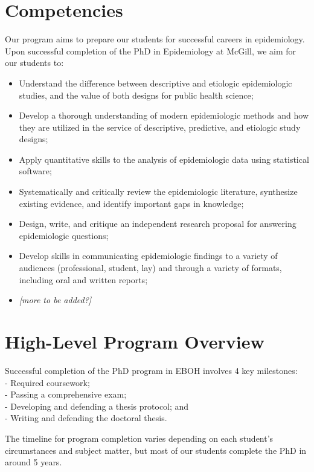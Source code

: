 \documentclass[
]{book}
\providecommand{\tightlist}{%
  \setlength{\itemsep}{0pt}\setlength{\parskip}{0pt}}
\begin{document}
\hypertarget{competencies}{%
\section{Competencies}\label{competencies}}

Our program aims to prepare our students for successful careers in epidemiology. Upon successful completion of the PhD in Epidemiology at McGill, we aim for our students to:

\begin{itemize}
\tightlist
\item
  Understand the difference between descriptive and etiologic epidemiologic studies, and the value of both designs for public health science;
\item
  Develop a thorough understanding of modern epidemiologic methods and how they are utilized in the service of descriptive, predictive, and etiologic study designs;
\item
  Apply quantitative skills to the analysis of epidemiologic data using statistical software;
\item
  Systematically and critically review the epidemiologic literature, synthesize existing evidence, and identify important gaps in knowledge;
\item
  Design, write, and critique an independent research proposal for answering epidemiologic questions;
\item
  Develop skills in communicating epidemiologic findings to a variety of audiences (professional, student, lay) and through a variety of formats, including oral and written reports;
\item
  \emph{{[}more to be added?{]}}
\end{itemize}

\hypertarget{high-level-program-overview}{%
\section{High-Level Program Overview}\label{high-level-program-overview}}

Successful completion of the PhD program in EBOH involves 4 key milestones:\\
- Required coursework;\\
- Passing a comprehensive exam;\\
- Developing and defending a thesis protocol; and\\
- Writing and defending the doctoral thesis.

The timeline for program completion varies depending on each student's circumstances and subject matter, but most of our students complete the PhD in around 5 years.
\end{document}
